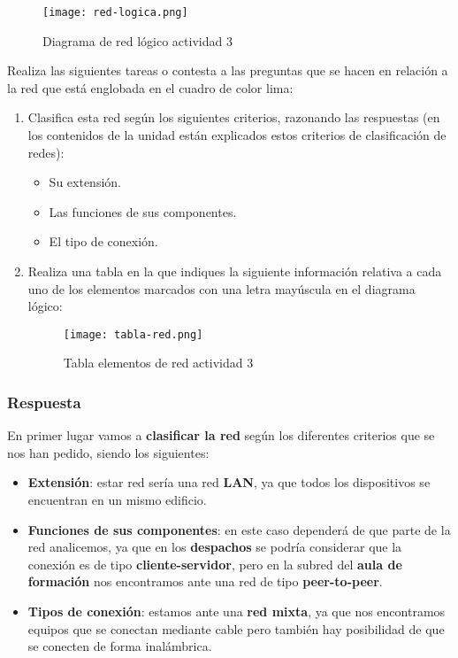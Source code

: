 \begin{figure}[H]
    \centering
    \texttt{[image: red-logica.png]}
    \caption{Diagrama de red lógico actividad 3}
\end{figure}

Realiza las siguientes tareas o contesta a las preguntas que se hacen en relación a la red que está englobada en el cuadro de color lima:

\begin{enumerate}
    \item Clasifica esta red según los siguientes criterios, razonando las respuestas (en los contenidos de la unidad están explicados estos criterios de clasificación de redes):
    \begin{itemize}
        \item Su extensión.
        \item Las funciones de sus componentes.
        \item El tipo de conexión.
    \end{itemize}

    \item Realiza una tabla en la que indiques la siguiente información relativa a cada uno de los elementos marcados con una letra mayúscula en el diagrama lógico:

    \begin{figure}[ht]
        \centering
        \texttt{[image: tabla-red.png]}
        \caption{Tabla elementos de red actividad 3}
    \end{figure}
\end{enumerate}

\subsubsection{Respuesta}

En primer lugar vamos a \textbf{clasificar la red} según los diferentes criterios que se nos han pedido, siendo los siguientes:

\begin{itemize}
    \item \textbf{Extensión}: estar red sería una red \textbf{LAN}, ya que todos los dispositivos se encuentran en un mismo edificio.

    \item \textbf{Funciones de sus componentes}: en este caso dependerá de que parte de la red analicemos, ya que en los \textbf{despachos} se podría considerar que la conexión es de tipo \textbf{cliente-servidor}, pero en la subred del \textbf{aula de formación} nos encontramos ante una red de tipo \textbf{peer-to-peer}.

   \item \textbf{Tipos de conexión}: estamos ante una \textbf{red mixta}, ya que nos encontramos equipos que se conectan mediante cable pero también hay posibilidad de que se conecten de forma inalámbrica.
\end{itemize}




\newpage



